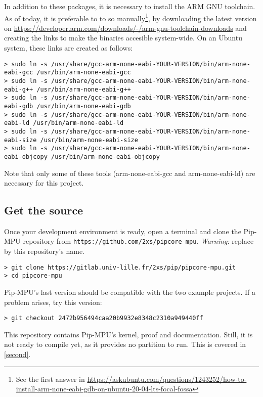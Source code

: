 \documentclass[10pt,a4paper,titlepage]{refart}
\begin{document}
In addition to these packages, it is necessary to install the ARM GNU toolchain. As of today, it is preferable to to so manually\footnote{See the first 
answer in \url{https://askubuntu.com/questions/1243252/how-to-install-arm-none-eabi-gdb-on-ubuntu-20-04-lts-focal-fossa}}, by downloading the latest version
on \url{https://developer.arm.com/downloads/-/arm-gnu-toolchain-downloads} and creating the links to make the binaries accesible system-wide. On an Ubuntu system, 
these links are created as follows:
\begin{lstlisting}[style=BashStyle]
> sudo ln -s /usr/share/gcc-arm-none-eabi-YOUR-VERSION/bin/arm-none-eabi-gcc /usr/bin/arm-none-eabi-gcc 
> sudo ln -s /usr/share/gcc-arm-none-eabi-YOUR-VERSION/bin/arm-none-eabi-g++ /usr/bin/arm-none-eabi-g++
> sudo ln -s /usr/share/gcc-arm-none-eabi-YOUR-VERSION/bin/arm-none-eabi-gdb /usr/bin/arm-none-eabi-gdb
> sudo ln -s /usr/share/gcc-arm-none-eabi-YOUR-VERSION/bin/arm-none-eabi-ld /usr/bin/arm-none-eabi-ld
> sudo ln -s /usr/share/gcc-arm-none-eabi-YOUR-VERSION/bin/arm-none-eabi-size /usr/bin/arm-none-eabi-size
> sudo ln -s /usr/share/gcc-arm-none-eabi-YOUR-VERSION/bin/arm-none-eabi-objcopy /usr/bin/arm-none-eabi-objcopy
\end{lstlisting}

Note that only some of these tools (arm-none-eabi-gcc and arm-none-eabi-ld) are necessary for this project.

\subsection{Get the source}
Once your development environment is ready, open a terminal and clone the Pip-MPU repository from \texttt{https://github.com/2xs/pipcore-mpu}.
\textit{Warning:} replace by this repository's name.

\begin{lstlisting}[style=BashStyle]
> git clone https://gitlab.univ-lille.fr/2xs/pip/pipcore-mpu.git
> cd pipcore-mpu
\end{lstlisting}

Pip-MPU's last version should be compatible with the two example projects. If a problem arises, try this version:

\begin{lstlisting}[style=BashStyle]
> git checkout 2472b956494caa20b9932e8348c2310a949440ff
\end{lstlisting}

This repository contains Pip-MPU's kernel, proof and documentation. Still,
it is not ready to compile yet, as it provides no partition to run.
This is covered in \cref{second}.
\end{document}
